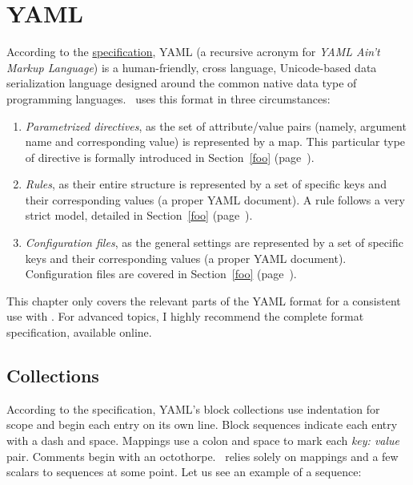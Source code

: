 \chapter{YAML}
\label{chap:yaml}

According to the \href{http://yaml.org/spec/1.2/spec.html}{specification}, YAML (a recursive acronym for \emph{YAML Ain't Markup Language}) is a human-friendly, cross language, Unicode-based data serialization language designed around the common native data type of programming languages. \arara\ uses this format in three circumstances:

\begin{enumerate}
\item\emph{Parametrized directives}, as the set of attribute/value pairs (namely, argument name and corresponding value) is represented by a map. This particular type of directive is formally introduced in Section~\ref{foo} (page~\pageref{foo}).

\item\emph{Rules}, as their entire structure is represented by a set of specific keys and their corresponding values (a proper YAML document). A rule follows a very strict model, detailed in Section~\ref{foo} (page~\pageref{foo}).

\item\emph{Configuration files}, as the general settings are represented by a set of specific keys and their corresponding values (a proper YAML document). Configuration files are covered in Section~\ref{foo} (page~\pageref{foo}).
\end{enumerate}

This chapter only covers the relevant parts of the YAML format for a consistent use with \arara. For advanced topics, I highly recommend the complete format specification, available online.

\section{Collections}
\label{sec:yamlcollections}

According to the specification, YAML's block collections use indentation for scope and begin each entry on its own line. Block sequences indicate each entry with a dash and space. Mappings use a colon and space to mark each \emph{key: value} pair. Comments begin with an octothorpe. \arara\ relies solely on mappings and a few scalars to sequences at some point. Let us see an example of a sequence:

